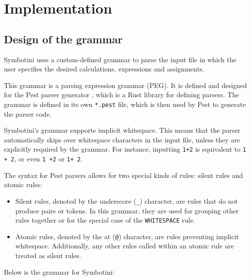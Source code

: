 \chapter{Implementation}\label{chap:implementation}

\lstset{language=Rust, style=colouredRust, numbers=none}

\section{Design of the grammar}\label{sec:design-of-the-grammar}

Symbotini uses a custom-defined grammar to parse the input file in which the user specifies the desired calculations, expressions and assignments.

This grammar is a parsing expression grammar (PEG). It is defined and designed for the Pest parser generator \parencite{pest-book}, which is a Rust library for defining parsers. The grammar is defined in its own \verb|*.pest| file, which is then used by Pest to generate the parser code.

Symbotini's grammar supports implicit whitespace. This means that the parser automatically skips over whitespace characters in the input file, unless they are explicitly required by the grammar. For instance, inputting \verb|1+2| is equivalent to \verb|1 + 2|, or even \verb|1 +2| or \verb|1+ 2|.

The syntax for Pest parsers allows for two special kinds of rules: silent rules and atomic rules:

\begin{itemize}
    \item Silent rules, denoted by the underscore (\verb|_|) character, are rules that do not produce pairs or tokens. In this grammar, they are used for grouping other rules together or for the special case of the \verb|WHITESPACE| rule.
    \item Atomic rules, denoted by the at (\verb|@|) character, are rules preventing implicit whitespace. Additionally, any other rules called within an atomic rule are treated as silent rules.
\end{itemize}

Below is the grammar for Symbotini:


